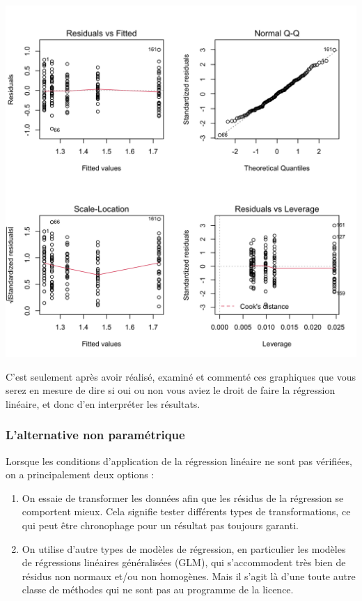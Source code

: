 \documentclass[
  a4paper,
]{article}
\providecommand{\tightlist}{%
  \setlength{\itemsep}{0pt}\setlength{\parskip}{0pt}}
\begin{document}
\begin{center}\includegraphics[width=0.9\linewidth]{figure/unnamed-chunk-123-1} \end{center}

C'est seulement après avoir réalisé, examiné et commenté ces graphiques que vous serez en mesure de dire si oui ou non vous aviez le droit de faire la régression linéaire, et donc d'en interpréter les résultats.

\hypertarget{lalternative-non-paramuxe9trique-5}{%
\subsubsection{L'alternative non paramétrique}\label{lalternative-non-paramuxe9trique-5}}

Lorsque les conditions d'application de la régression linéaire ne sont pas vérifiées, on a principalement deux options :

\begin{enumerate}
\def\labelenumi{\arabic{enumi}.}
\tightlist
\item
  On essaie de transformer les données afin que les résidus de la régression se comportent mieux. Cela signifie tester différents types de transformations, ce qui peut être chronophage pour un résultat pas toujours garanti.
\item
  On utilise d'autre types de modèles de régression, en particulier les modèles de régressions linéaires généralisées (GLM), qui s'accommodent très bien de résidus non normaux et/ou non homogènes. Mais il s'agit là d'une toute autre classe de méthodes qui ne sont pas au programme de la licence.
\end{enumerate}
\end{document}
